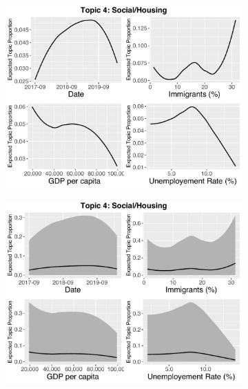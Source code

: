 \begin{figure}[h!]
    \centering
  \begin{subfigure}[b]{0.3\linewidth}
    \includegraphics[width=\linewidth]{../plots/appendix/5_1/direct_t4_without_credible.pdf}
  \end{subfigure}
  \begin{subfigure}[b]{0.3\linewidth}
    \includegraphics[width=\linewidth]{../plots/appendix/5_1/direct_t4_with_credible.pdf}
  \end{subfigure}
  \begin{subfigure}[b]{0.3\linewidth}

\end{subfigure}
\end{figure}
